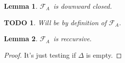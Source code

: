 \documentclass[a4paper,10pt]{report}
\newtheorem{lm}{Lemma}[thr]
\newtheorem{td}{TODO}
\newcommand{\F}{$\mathcal{F}_{A}$}
\begin{document}
\begin{lm} \label{cd5}
  \F\ is downward closed.
\end{lm}
\begin{td}
  Will be by definition of \F.
\end{td}

\begin{lm} \label{cd6}
  \F\ is reccursive.
\end{lm}

\begin{proof}
  It's just testing if $\Delta$ is empty.
\end{proof}
\end{document}

